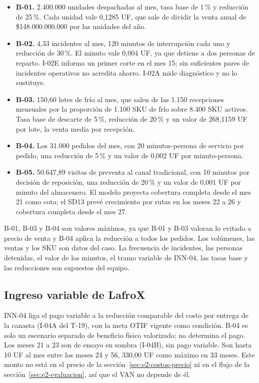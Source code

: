\begin{itemize}
  \item \textbf{B-01.} 2.400.000 unidades despachadas al mes, tasa base de 1\,\% y reducción de 25\,\%. Cada unidad vale 0,1285 UF, que sale de dividir la venta anual de \$148.000.000.000 por las unidades del año.
  \item \textbf{B-02.} 4,33 incidentes al mes, 120 minutos de interrupción cada uno y reducción de 30\,\%. El minuto vale 0,004 UF, ya que detiene a dos personas de reparto. I-02E informa un primer corte en el mes 15; sin suficientes pares de incidentes operativos no acredita ahorro. I-02A mide diagnóstico y no lo sustituye.
  \item \textbf{B-03.} 150,60 lotes de frío al mes, que salen de las 1.150 recepciones mensuales por la proporción de 1.100 SKU de frío sobre 8.400 SKU activos. Tasa base de descarte de 5\,\%, reducción de 20\,\% y un valor de 268,1159 UF por lote, la venta media por recepción.
  \item \textbf{B-04.} Los 31.000 pedidos del mes, con 20 minutos-persona de servicio por pedido, una reducción de 5\,\% y un valor de 0,002 UF por minuto-persona.
  \item \textbf{B-05.} 50.647,89 visitas de preventa al canal tradicional, con 10 minutos por decisión de reposición, una reducción de 20\,\% y un valor de 0,001 UF por minuto del almacenero. El modelo proyecta cobertura completa desde el mes 21 como cota; el SD13 prevé crecimiento por rutas en los meses 22 a 26 y cobertura completa desde el mes 27.
\end{itemize}

B-01, B-03 y B-04 son valores máximos, ya que B-01 y B-03 valoran lo evitado a precio de venta y B-04 aplica la reducción a todos los pedidos. Los volúmenes, las ventas y los SKU son datos del caso. La frecuencia de incidentes, las personas detenidas, el valor de los minutos, el tramo variable de INN-04, las tasas base y las reducciones son supuestos del equipo.

\subsection{Ingreso variable de LafroX}
\label{sec:e2-inn-ingreso}

INN-04 liga el pago variable a la reducción comparable del costo por entrega de la canasta (I-04A del T-19), con la meta OTIF vigente como condición. B-04 es solo un escenario separado de beneficio físico valorizado; no determina el pago. Los meses 21 a 23 son de ensayo en sombra (I-04B), sin pago variable. Son hasta 10 UF al mes entre los meses 24 y 56, 330,00 UF como máximo en 33 meses. Este monto no está en el precio de la sección~\ref{sec:e2-costos-precio} ni en el flujo de la sección~\ref{sec:e2-evaluacion}, así que el VAN no depende de él.

